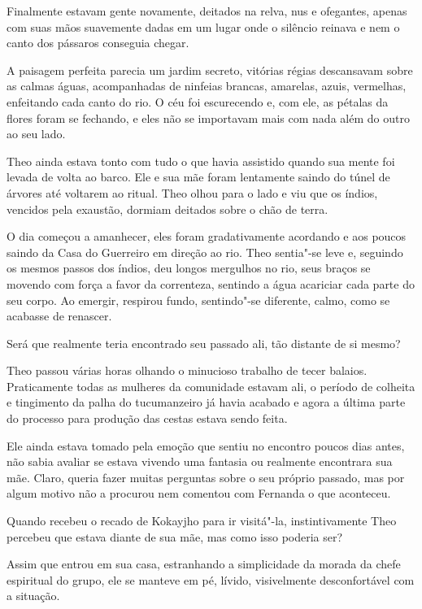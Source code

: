 Finalmente estavam gente novamente, deitados na relva, nus e ofegantes,
apenas com suas mãos suavemente dadas em um lugar onde o silêncio
reinava e nem o canto dos pássaros conseguia chegar.

A paisagem perfeita parecia um jardim secreto, vitórias régias
descansavam sobre as calmas águas, acompanhadas de ninfeias brancas,
amarelas, azuis, vermelhas, enfeitando cada canto do rio. O céu foi
escurecendo e, com ele, as pétalas da flores foram se fechando, e eles não
se importavam mais com nada além do outro ao seu lado.

Theo ainda estava tonto com tudo o que havia assistido quando sua mente
foi levada de volta ao barco. Ele e sua mãe foram lentamente saindo do
túnel de árvores até voltarem ao ritual. Theo olhou para o lado e viu
que os índios, vencidos pela exaustão, dormiam deitados sobre o chão de
terra.

O dia começou a amanhecer, eles foram gradativamente acordando e aos
poucos saindo da Casa do Guerreiro em direção ao rio. Theo sentia"-se
leve e, seguindo os mesmos passos dos índios, deu longos mergulhos no
rio, seus braços se movendo com força a favor da correnteza, sentindo a
água acariciar cada parte do seu corpo. Ao emergir, respirou fundo,
sentindo"-se diferente, calmo, como se acabasse de renascer.

Será que realmente teria encontrado seu passado ali, tão distante de si
mesmo?

\asterisc


Theo passou várias horas olhando o minucioso trabalho de tecer balaios.
Praticamente todas as mulheres da comunidade estavam ali, o período de
colheita e tingimento da palha do tucumanzeiro já havia acabado e agora
a última parte do processo para produção das cestas estava sendo feita.

Ele ainda estava tomado pela emoção que sentiu no encontro poucos dias
antes, não sabia avaliar se estava vivendo uma fantasia ou realmente
encontrara sua mãe. Claro, queria fazer muitas perguntas sobre o seu
próprio passado, mas por algum motivo não a procurou nem comentou com
Fernanda o que aconteceu.

Quando recebeu o recado de Kokayjho para ir visitá"-la, instintivamente
Theo percebeu que estava diante de sua mãe, mas como isso poderia ser?

Assim que entrou em sua casa, estranhando a simplicidade da morada da
chefe espiritual do grupo, ele se manteve em pé, lívido, visivelmente
desconfortável com a situação.

